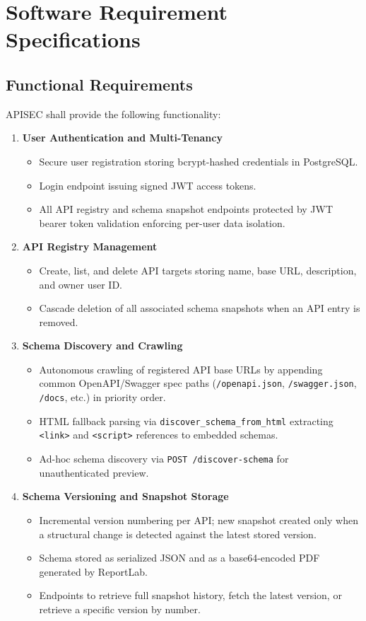 \documentclass{fisatprojectfinal}
\begin{document}
\section{Software Requirement Specifications}
\subsection{Functional Requirements}
APISEC shall provide the following functionality:

\begin{enumerate}
    \item \textbf{User Authentication and Multi-Tenancy}
    \begin{itemize}
        \item Secure user registration storing bcrypt-hashed credentials in PostgreSQL.
        \item Login endpoint issuing signed JWT access tokens.
        \item All API registry and schema snapshot endpoints protected by JWT bearer token validation enforcing per-user data isolation.
    \end{itemize}

    \item \textbf{API Registry Management}
    \begin{itemize}
        \item Create, list, and delete API targets storing name, base URL, description, and owner user ID.
        \item Cascade deletion of all associated schema snapshots when an API entry is removed.
    \end{itemize}

    \item \textbf{Schema Discovery and Crawling}
    \begin{itemize}
        \item Autonomous crawling of registered API base URLs by appending common OpenAPI/Swagger spec paths (\texttt{/openapi.json}, \texttt{/swagger.json}, \texttt{/docs}, etc.) in priority order.
        \item HTML fallback parsing via \texttt{discover\_schema\_from\_html} extracting \texttt{<link>} and \texttt{<script>} references to embedded schemas.
        \item Ad-hoc schema discovery via \texttt{POST /discover-schema} for unauthenticated preview.
    \end{itemize}

    \item \textbf{Schema Versioning and Snapshot Storage}
    \begin{itemize}
        \item Incremental version numbering per API; new snapshot created only when a structural change is detected against the latest stored version.
        \item Schema stored as serialized JSON and as a base64-encoded PDF generated by ReportLab.
        \item Endpoints to retrieve full snapshot history, fetch the latest version, or retrieve a specific version by number.
    \end{itemize}


\end{enumerate}
\end{document}
